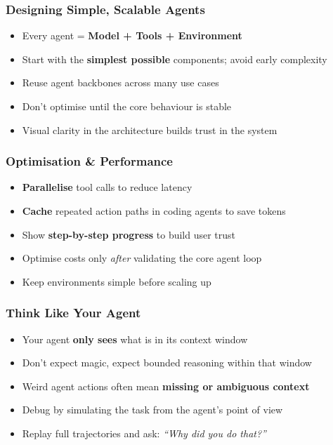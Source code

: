 \begin{frame}[fragile]\frametitle{Designing Simple, Scalable Agents}
    \begin{itemize}
        \item Every agent = \textbf{Model + Tools + Environment}
        \item Start with the \textbf{simplest possible} components; avoid early complexity
        \item Reuse agent backbones across many use cases
        \item Don't optimise until the core behaviour is stable
        \item Visual clarity in the architecture builds trust in the system
    \end{itemize}
\end{frame}

\begin{frame}[fragile]\frametitle{Optimisation \& Performance}
    \begin{itemize}
        \item \textbf{Parallelise} tool calls to reduce latency
        \item \textbf{Cache} repeated action paths in coding agents to save tokens
        \item Show \textbf{step-by-step progress} to build user trust
        \item Optimise costs only \emph{after} validating the core agent loop
        \item Keep environments simple before scaling up
    \end{itemize}
\end{frame}

\begin{frame}[fragile]\frametitle{Think Like Your Agent}
    \begin{itemize}
        \item Your agent \textbf{only sees} what is in its context window
        \item Don't expect magic, expect bounded reasoning within that window
        \item Weird agent actions often mean \textbf{missing or ambiguous context}
        \item Debug by simulating the task from the agent's point of view
        \item Replay full trajectories and ask: \emph{``Why did you do that?''}
    \end{itemize}
\end{frame}

